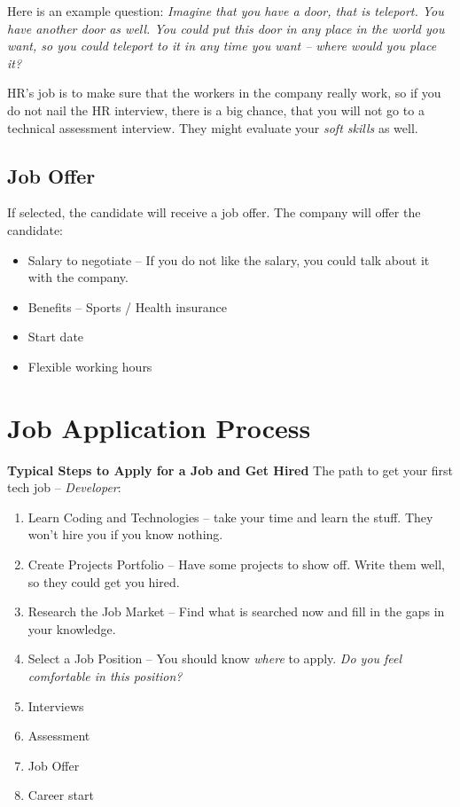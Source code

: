 Here is an example question: \textit{Imagine that you have a door, that is teleport. You have another door as well. You could put this door in any place in the world you want, so you could teleport to it in any time you want -- where would you place it?}

HR's job is to make sure that the workers in the company really work, so if you do not nail the HR interview, there is a big chance, that you will not go to a technical assessment interview. They might evaluate your \textit{soft skills} as well.
\subsection{Job Offer}
If selected, the candidate will receive a job offer.
The company will offer the candidate:
\begin{itemize}
    \item Salary to negotiate -- If you do not like the salary, you could talk about it with the company.
    \item Benefits -- Sports / Health insurance
    \item Start date
    \item Flexible working hours
\end{itemize}
\section{Job Application Process}
\textbf{Typical Steps to Apply for a Job and Get Hired}
The path to get your first tech job -- \textit{Developer}:
\begin{enumerate}
    \item Learn Coding and Technologies -- take your time and learn the stuff. They won't hire you if you know nothing.
    \item Create Projects Portfolio -- Have some projects to show off. Write them well, so they could get you hired.
    \item Research the Job Market -- Find what is searched now and fill in the gaps in your knowledge.
    \item Select a Job Position -- You should know \textit{where} to apply. \textit{Do you feel comfortable in this position?}
    \item Interviews
    \item Assessment
    \item Job Offer
    \item Career start
\end{enumerate}
